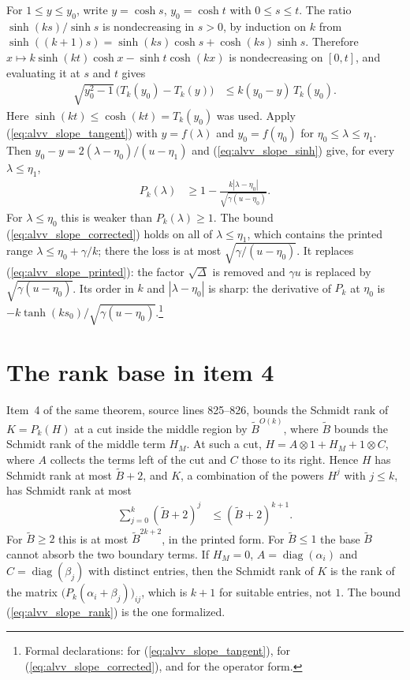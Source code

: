 \documentclass{article}
\begin{document}
For $1\le y\le y_0$, write $y=\cosh s$, $y_0=\cosh t$ with $0\le s\le t$.
The ratio $\sinh(ks)/\sinh s$ is nondecreasing in $s>0$, by induction on $k$
from $\sinh((k+1)s)=\sinh(ks)\cosh s+\cosh(ks)\sinh s$. Therefore
$x\mapsto k\sinh(kt)\cosh x-\sinh t\cosh(kx)$ is nondecreasing on $[0,t]$,
and evaluating it at $s$ and $t$ gives
\begin{align}
    \sqrt{y_0^2-1}\,\bigl(T_k(y_0)-T_k(y)\bigr)
     & \le k(y_0-y)\,T_k(y_0).
    \label{eq:alvv_slope_tangent}
\end{align}
Here $\sinh(kt)\le\cosh(kt)=T_k(y_0)$ was used. Apply
(\ref{eq:alvv_slope_tangent}) with $y=f(\lambda)$ and $y_0=f(\eta_0)$ for
$\eta_0\le\lambda\le\eta_1$. Then $y_0-y=2(\lambda-\eta_0)/(u-\eta_1)$ and
(\ref{eq:alvv_slope_sinh}) give, for every $\lambda\le\eta_1$,
\begin{align}
    P_k(\lambda) & \ge1-\frac{k|\lambda-\eta_0|}{\sqrt{\gamma(u-\eta_0)}}.
    \label{eq:alvv_slope_corrected}
\end{align}
For $\lambda\le\eta_0$ this is weaker than $P_k(\lambda)\ge1$. The bound
(\ref{eq:alvv_slope_corrected}) holds on all of $\lambda\le\eta_1$, which
contains the printed range $\lambda\le\eta_0+\gamma/k$; there the loss is at
most $\sqrt{\gamma/(u-\eta_0)}$. It replaces (\ref{eq:alvv_slope_printed}):
the factor $\sqrt\Delta$ is removed and $\gamma u$ is replaced by
$\sqrt{\gamma(u-\eta_0)}$. Its order in $k$ and $|\lambda-\eta_0|$ is sharp:
the derivative of $P_k$ at $\eta_0$ is
$-k\tanh(ks_0)/\sqrt{\gamma(u-\eta_0)}$.\footnote{Formal declarations:
     for
    (\ref{eq:alvv_slope_tangent}),
    for (\ref{eq:alvv_slope_corrected}), and
     for
    the operator form.}

\section{The rank base in item 4}

Item~4 of the same theorem, source lines 825--826, bounds the Schmidt rank
of $K=P_k(H)$ at a cut inside the middle region by $\tilde B^{O(k)}$, where
$\tilde B$ bounds the Schmidt rank of the middle term $H_M$. At such a cut,
$H=A\otimes1+H_M+1\otimes C$, where $A$ collects the terms left of the cut
and $C$ those to its right. Hence $H$ has Schmidt rank at most $\tilde B+2$,
and $K$, a combination of the powers $H^j$ with $j\le k$, has Schmidt rank at
most
\begin{align}
    \sum_{j=0}^k(\tilde B+2)^j & \le(\tilde B+2)^{k+1}.
    \label{eq:alvv_slope_rank}
\end{align}
For $\tilde B\ge2$ this is at most $\tilde B^{2k+2}$, in the printed form.
For $\tilde B\le1$ the base $\tilde B$ cannot absorb the two boundary
terms. If $H_M=0$, $A=\operatorname{diag}(\alpha_i)$ and
$C=\operatorname{diag}(\beta_j)$ with distinct entries, then the Schmidt rank
of $K$ is the rank of the matrix $\bigl(P_k(\alpha_i+\beta_j)\bigr)_{ij}$,
which is $k+1$ for suitable entries, not $1$. The bound
(\ref{eq:alvv_slope_rank}) is the one formalized.
\end{document}
